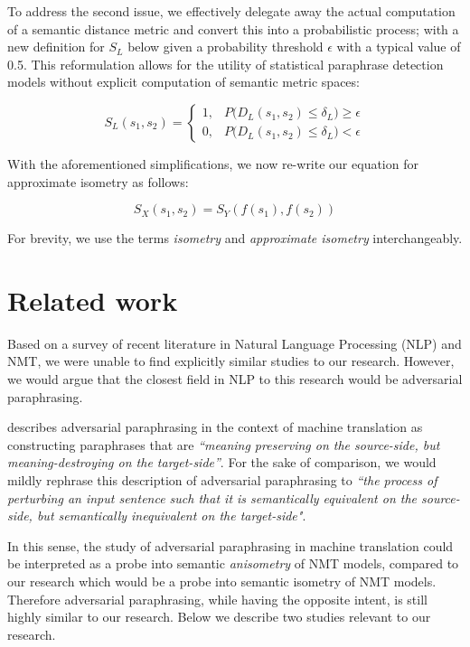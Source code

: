 \documentclass[11pt,a4paper]{article}
\begin{document}
To address the second issue, we effectively delegate away the actual computation
of a semantic distance metric and convert this into a probabilistic process;
with a new definition for $S_L$ below given a probability threshold $\epsilon$
with a typical value of 0.5. This reformulation allows for the utility of
statistical paraphrase detection models without explicit computation of semantic
metric spaces:

\begin{equation}
  \label{bounded_isometry_probability_eqn}
  S_L(s_1,s_2) =
  \begin{cases}
    1, &P\big(D_L(s_1,s_2) \leq \delta_L\big) \geq \epsilon \\
    0, &P\big(D_L(s_1,s_2) \leq \delta_L\big) < \epsilon
  \end{cases}
\end{equation}

With the aforementioned simplifications, we now re-write our equation for
approximate isometry as follows:

\begin{equation}
  \label{exact_approx_isometry_eqn}
  S_X(s_1,s_2) = S_Y(f(s_1),f(s_2))
\end{equation}

For brevity, we use the terms \textit{isometry} and \textit{approximate
  isometry} interchangeably.

\section{Related work}

Based on a survey of recent literature in Natural Language Processing (NLP) and
NMT, we were unable to find explicitly similar studies to our research. However,
we would argue that the closest field in NLP to this research would be
adversarial paraphrasing.

\citet{michel2019evaluation} describes adversarial paraphrasing in the context
of machine translation as constructing paraphrases that are \textit{``meaning
  preserving on the source-side, but meaning-destroying on the target-side''}.
For the sake of comparison, we would mildly rephrase this description of
adversarial paraphrasing to \textit{``the process of perturbing an input
  sentence such that it is semantically equivalent on the source-side, but
  semantically inequivalent on the target-side"}.

In this sense, the study of adversarial paraphrasing in machine translation
could be interpreted as a probe into semantic \textit{anisometry} of NMT models,
compared to our research which would be a probe into semantic isometry of NMT
models. Therefore adversarial paraphrasing, while having the opposite intent, is
still highly similar to our research. Below we describe two studies relevant to
our research.
\end{document}
